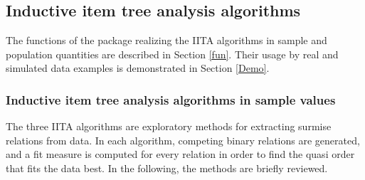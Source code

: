 \documentclass[nojss]{jss}
\begin{document}
\subsection{Inductive item tree analysis algorithms}
\label{subsec:IITA}

The functions of the package  realizing the IITA algorithms in sample and population quantities are described in Section \ref{fun}. Their usage by real and simulated data examples is demonstrated in Section \ref{Demo}.

\subsubsection{Inductive item tree analysis algorithms in sample values}

The three IITA algorithms are exploratory methods for extracting surmise relations from data. In each algorithm, competing binary relations are generated, and a fit measure is computed for every relation in order to find the quasi order that fits the data best. 
In the following, the methods are briefly reviewed.
\end{document}
